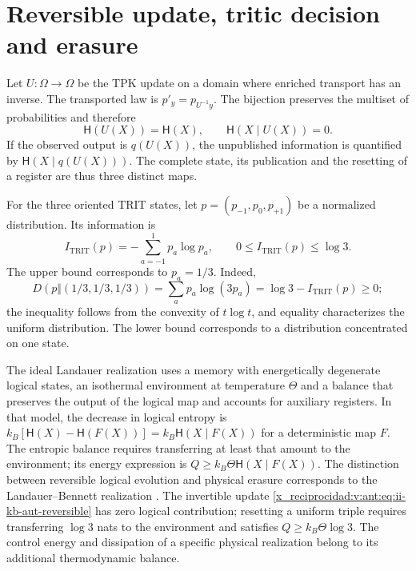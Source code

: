 \section{Reversible update, tritic decision and erasure}

Let \(U:\Omega\to\Omega\) be the TPK update on a domain where
enriched transport has an inverse. The transported law is
\(p'_y=p_{U^{-1}y}\). The bijection preserves the multiset of
probabilities and therefore
\begin{equation}
 \mathsf H(U(X))=\mathsf H(X),\qquad
 \mathsf H(X\mid U(X))=0.
 \label{x_reciprocidad:v:ant:eq:ii-kb-aut-reversible}
\end{equation}
If the observed output is \(q(U(X))\), the unpublished information
is quantified by \(\mathsf H(X\mid q(U(X)))\). The complete state,
its publication and the resetting of a register are thus three distinct maps.

For the three oriented TRIT states, let
\(p=(p_{-1},p_0,p_{+1})\) be a normalized distribution. Its information is
\begin{equation}
 I_{\mathrm{TRIT}}(p)=-\sum_{a=-1}^{1}p_a\log p_a,
 \qquad 0\leq I_{\mathrm{TRIT}}(p)\leq\log3.
 \label{x_reciprocidad:v:ant:eq:ii-kb-aut-trit}
\end{equation}
The upper bound corresponds to \(p_a=1/3\). Indeed,
\[
 D(p\Vert(1/3,1/3,1/3))
 =\sum_ap_a\log(3p_a)=\log3-I_{\mathrm{TRIT}}(p)\geq0;
\]
the inequality follows from the convexity of \(t\log t\), and
equality characterizes the uniform distribution. The lower bound
corresponds to a distribution concentrated on one state.

The ideal Landauer realization uses a memory with energetically
degenerate logical states, an isothermal environment at temperature \(\Theta\)
and a balance that preserves the output of the logical map and accounts for
auxiliary registers. In that model, the decrease in logical entropy is
\(k_B[\mathsf H(X)-\mathsf H(F(X))]
=k_B\mathsf H(X\mid F(X))\) for a deterministic map \(F\).
The entropic balance requires transferring at least that amount to the environment;
its energy expression is \(Q\geq k_B\Theta\mathsf H(X\mid F(X))\).
The distinction between reversible logical evolution and physical erasure
corresponds to the Landauer--Bennett realization \cite{x_reciprocidad:bennett2003}.
The invertible update
\eqref{x_reciprocidad:v:ant:eq:ii-kb-aut-reversible} has zero logical contribution;
resetting a uniform triple requires transferring \(\log3\) nats
to the environment and satisfies \(Q\geq k_B\Theta\log3\).
The control energy and dissipation of a specific physical
realization belong to its additional thermodynamic balance.

